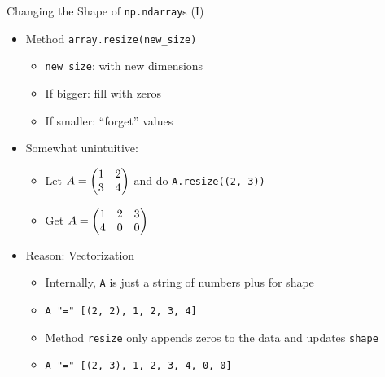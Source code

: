 \begin{frame}[fragile]{Changing the Shape of \texttt{np.ndarray}s (I)}
%
\begin{itemize}
\item Method \texttt{array.resize(new\_size)}
	\begin{itemize}
	\item \texttt{new\_size}:  with new dimensions
	\item If bigger: fill with zeros
	\item If smaller: \enquote{forget} values
	\end{itemize}
\item Somewhat unintuitive:
	\begin{itemize}
	\item Let $\displaystyle A = \mqty(1 & 2 \\ 3 & 4)$ and do \texttt{A.resize((2, 3))}
	\item Get $\displaystyle A = \mqty(1 & 2 & 3 \\ 4 & 0 & 0)$
	\end{itemize}
\item Reason: Vectorization
	\begin{itemize}
	\item Internally, \texttt{A} is just a string of numbers plus  for shape
	\item \texttt{A "=" [(2, 2), 1, 2, 3, 4]}
	\item Method \texttt{resize} only appends zeros to the data and updates \texttt{shape}
	\item[\Thus] \texttt{A "=" [(2, 3), 1, 2, 3, 4, 0, 0]}
	\end{itemize}
\end{itemize}
%
\end{frame}


